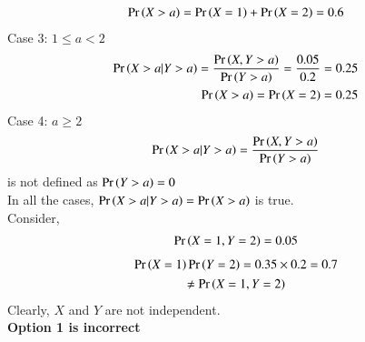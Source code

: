 \documentclass[journal,12pt,twocolumn]{IEEEtran}
\begin{document}
\begin{enumerate}
\begin{align}
        \Pr\left(X>a\right)=\Pr\left(X=1\right)+\Pr\left(X=2\right)=0.6
    \end{align}
    Case 3: $1\leq a <2$
    \begin{align}
        \Pr\left(X>a|Y>a\right)=\frac{\Pr\left(X,Y>a\right)}{\Pr\left(Y>a\right)}=\frac{0.05}{0.2}=0.25\\
        \Pr\left(X>a\right)=\Pr\left(X=2\right)=0.25
    \end{align}
    Case 4: $a\geq 2$
    \begin{align}
        \Pr\left(X>a|Y>a\right)=\frac{\Pr\left(X,Y>a\right)}{\Pr\left(Y>a\right)}
    \end{align}
    is not defined as $\Pr\left(Y>a\right)=0$\\
    In all the cases, $\Pr\left(X>a|Y>a\right)=\Pr\left(X>a\right)$ is true.\\
    Consider,
    \begin{align}
        \Pr\left(X=1,Y=2\right)=0.05
    \end{align}
    \begin{multline}
        \Pr\left(X=1\right)\Pr\left(Y=2\right)=0.35\times0.2=0.7\\\neq\Pr\left(X=1,Y=2\right)
    \end{multline} 
    Clearly, $X$ and $Y$ are not independent. \\
    \textbf{Option 1 is incorrect}
    

\end{enumerate}
\end{document}
